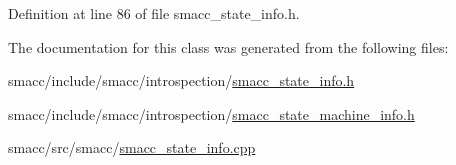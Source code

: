 Definition at line 86 of file smacc\+\_\+state\+\_\+info.\+h.



The documentation for this class was generated from the following files\+:\begin{DoxyCompactItemize}
\item 
smacc/include/smacc/introspection/\hyperlink{smacc__state__info_8h}{smacc\+\_\+state\+\_\+info.\+h}\item 
smacc/include/smacc/introspection/\hyperlink{smacc__state__machine__info_8h}{smacc\+\_\+state\+\_\+machine\+\_\+info.\+h}\item 
smacc/src/smacc/\hyperlink{smacc__state__info_8cpp}{smacc\+\_\+state\+\_\+info.\+cpp}\end{DoxyCompactItemize}
